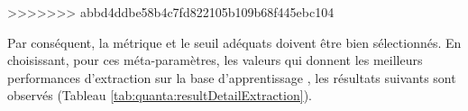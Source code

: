 %
%
%
%
%
%
%
>>>>>>> abbd4ddbe58b4c7fd822105b109b68f445ebc104

Par conséquent, la métrique et le seuil adéquats doivent être bien sélectionnés. En choisissant, pour ces méta-paramètres, les valeurs qui donnent les meilleurs performances d'extraction sur la base d'apprentissage , les résultats suivants sont observés (Tableau \ref{tab:quanta:resultDetailExtraction}).
 

